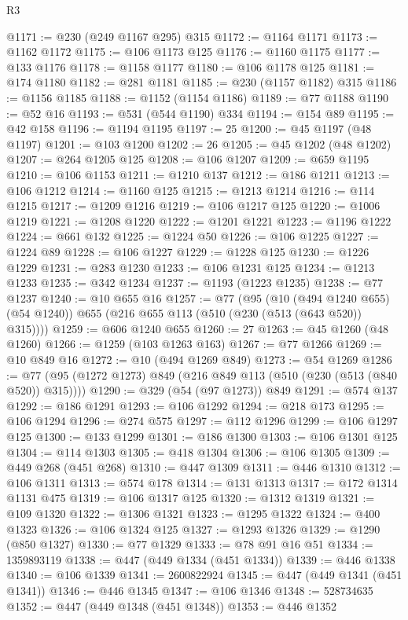 \begin{lexlean}{R3}
\begin{coremodule}
@1171 := @230 (@249 @1167 @295) @315
@1172 := @1164 @1171
@1173 := @1162 @1172
@1175 := @106 @1173 @125
@1176 := @1160 @1175
@1177 := @133 @1176
@1178 := @1158 @1177
@1180 := @106 @1178 @125
@1181 := @174 @1180
@1182 := @281 @1181
@1185 := @230 (@1157 @1182) @315
@1186 := @1156 @1185
@1188 := @1152 (@1154 @1186)
@1189 := @77 @1188
@1190 := @52 @16
@1193 := @531 (@544 @1190) @334
@1194 := @154 @89
@1195 := @42 @158
@1196 := @1194 @1195
@1197 := 25
@1200 := @45 @1197 (@48 @1197)
@1201 := @103 @1200
@1202 := 26
@1205 := @45 @1202 (@48 @1202)
@1207 := @264 @1205 @125
@1208 := @106 @1207
@1209 := @659 @1195
@1210 := @106 @1153
@1211 := @1210 @137
@1212 := @186 @1211
@1213 := @106 @1212
@1214 := @1160 @125
@1215 := @1213 @1214
@1216 := @114 @1215
@1217 := @1209 @1216
@1219 := @106 @1217 @125
@1220 := @1006 @1219
@1221 := @1208 @1220
@1222 := @1201 @1221
@1223 := @1196 @1222
@1224 := @661 @132
@1225 := @1224 @50
@1226 := @106 @1225
@1227 := @1224 @89
@1228 := @106 @1227
@1229 := @1228 @125
@1230 := @1226 @1229
@1231 := @283 @1230
@1233 := @106 @1231 @125
@1234 := @1213 @1233
@1235 := @342 @1234
@1237 := @1193 (@1223 @1235)
@1238 := @77 @1237
@1240 := @10 @655 @16
@1257 := @77
    (@95
      (@10 (@494 @1240 @655) (@54 @1240))
      @655
      (@216 @655 @113 (@510 (@230 (@513 (@643 @520)) @315))))
@1259 := @606 @1240 @655
@1260 := 27
@1263 := @45 @1260 (@48 @1260)
@1266 := @1259 (@103 @1263 @163)
@1267 := @77 @1266
@1269 := @10 @849 @16
@1272 := @10 (@494 @1269 @849)
@1273 := @54 @1269
@1286 := @77 (@95 (@1272 @1273) @849 (@216 @849 @113 (@510 (@230 (@513 (@840 @520)) @315))))
@1290 := @329 (@54 (@97 @1273)) @849
@1291 := @574 @137
@1292 := @186 @1291
@1293 := @106 @1292
@1294 := @218 @173
@1295 := @106 @1294
@1296 := @274 @575
@1297 := @112 @1296
@1299 := @106 @1297 @125
@1300 := @133 @1299
@1301 := @186 @1300
@1303 := @106 @1301 @125
@1304 := @114 @1303
@1305 := @418 @1304
@1306 := @106 @1305
@1309 := @449 @268 (@451 @268)
@1310 := @447 @1309
@1311 := @446 @1310
@1312 := @106 @1311
@1313 := @574 @178
@1314 := @131 @1313
@1317 := @172 @1314 @1131 @475
@1319 := @106 @1317 @125
@1320 := @1312 @1319
@1321 := @109 @1320
@1322 := @1306 @1321
@1323 := @1295 @1322
@1324 := @400 @1323
@1326 := @106 @1324 @125
@1327 := @1293 @1326
@1329 := @1290 (@850 @1327)
@1330 := @77 @1329
@1333 := @78 @91 @16 @51
@1334 := 1359893119
@1338 := @447 (@449 @1334 (@451 @1334))
@1339 := @446 @1338
@1340 := @106 @1339
@1341 := 2600822924
@1345 := @447 (@449 @1341 (@451 @1341))
@1346 := @446 @1345
@1347 := @106 @1346
@1348 := 528734635
@1352 := @447 (@449 @1348 (@451 @1348))
@1353 := @446 @1352

\end{coremodule}
\end{lexlean}
